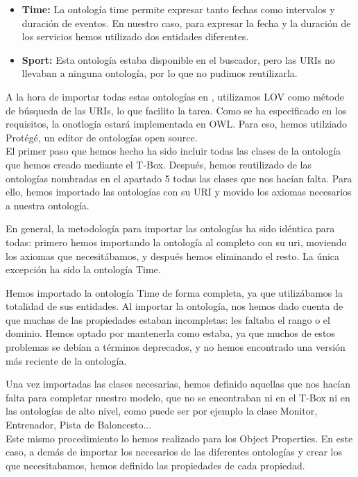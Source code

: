 \documentclass[a4paper,12pt]{article}
\begin{document}
	\begin{itemize}
		\item \textbf{Time:} La ontología time permite expresar tanto fechas como intervalos y duración de eventos. En nuestro caso, para expresar la fecha y la duración de los servicios hemos utilizado dos entidades diferentes.
		\item \textbf{Sport:} Esta ontología estaba disponible en el buscador, pero las URIs no llevaban a ninguna ontología, por lo que no pudimos reutilizarla. 
	\end{itemize}
	A la hora de importar todas estas ontologías en , utilizamos LOV como métode de búsqueda de las URIs, lo que facilito la tarea. 
	Como se ha especificado en los requisitos, la onotlogía estará implementada en OWL. Para eso, hemos utilziado Protégé, un editor de ontologías open source. \\
	
	El primer paso que hemos hecho ha sido incluir todas las clases de la ontología que hemos creado mediante el T-Box. Después, hemos reutilizado de las ontologías nombradas en el apartado 5 todas las clases que nos hacían falta. Para ello, hemos importado las ontologías con su URI y movido los axiomas necesarios a nuestra ontología.
	
	En general, la metodología para importar las ontologías ha sido idéntica para todas: primero hemos importando la ontología al completo con su uri, moviendo los axiomas que necesitábamos, y después hemos eliminando el resto. La única excepción ha sido la ontología Time. 
	
	Hemos importado la ontología Time de forma completa, ya que utilizábamos la totalidad de sus entidades. Al importar la ontología, nos hemos dado cuenta de que muchas de las propiedades estaban incompletas: les faltaba el rango o el dominio. Hemos optado por mantenerla como estaba, ya que muchos de estos problemas se debían a términos deprecados, y no hemos encontrado una versión más reciente de la ontología.
	
	Una vez importadas las clases necesarias, hemos definido aquellas que nos hacían falta para completar nuestro modelo, que no se encontraban ni en el T-Box ni en las ontologías de alto nivel, como puede ser por ejemplo la clase Monitor, Entrenador, Pista de Baloncesto... \\
		
	Este mismo procedimiento lo hemos realizado para los Object Properties. En este caso, a demás de importar los necesarios de las diferentes ontologías y crear los que necesitabamos, hemos definido las propiedades de cada propiedad. \\
		
\end{document}
